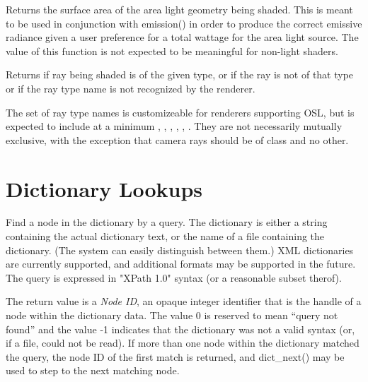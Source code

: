 \documentclass[11pt,letterpaper]{book}
\begin{document}
\apiend

Returns the surface area of the area light geometry being shaded.  This
is meant to be used in conjunction with {\cf emission()} in order to 
produce the correct emissive radiance given a user preference for a
total wattage for the area light source.  The value of this function 
is not expected to be meaningful for non-light shaders.
\apiend


Returns {} if ray being shaded is of the given type, or {} if
the ray is not of that type or if the ray type name is not recognized by
the renderer.

The set of ray type names is customizeable for renderers supporting
OSL, but is expected to include at a minimum ,
, , , ,
.  They are not necessarily mutually exclusive, with the
exception that camera rays should be of class  and no other.
\apiend


\section{Dictionary Lookups}
\label{sec:stdlib:dictionaries}

    Find a node in the dictionary by a query.  The {\cf dictionary} is
    either a string containing the actual dictionary text, or the name
    of a file containing the dictionary.  (The system can easily
    distinguish between them.)  XML dictionaries are currently
    supported, and additional formats may be supported in the future.
    The query is expressed in "XPath 1.0" syntax (or a reasonable subset
    therof).

    The return value is a \emph{Node ID}, an opaque integer identifier
    that is the handle of a node within the dictionary data.  The value
    0 is reserved to mean ``query not found'' and the value -1 indicates
    that the dictionary was not a valid syntax (or, if a file, could not
    be read).  If more than one node within
    the dictionary matched the query, the node ID of the first match is
    returned, and {\cf dict_next()} may be used to step to the next
    matching node.
\end{document}
